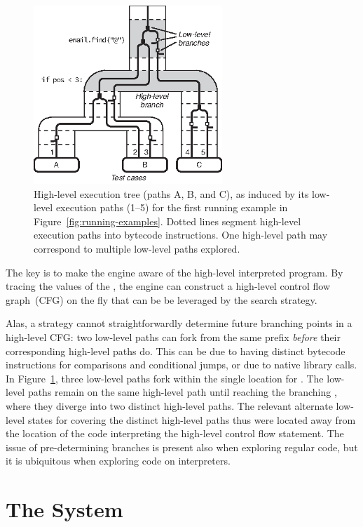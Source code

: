 \begin{figure}
  \centering
  \includegraphics[width=2.8in]{chef/figures/hl-symbex}
  \caption{High-level execution tree (paths A, B, and C), as induced by its low-level execution paths (1--5) for the first running example in Figure~\ref{fig:running-examples}.  Dotted lines segment high-level execution paths into bytecode instructions.  One high-level path may correspond to multiple low-level paths explored.}
  \label{fig:hl-symbex}
\end{figure}

The key is to make the engine aware of the high-level interpreted program. By tracing the values of the \hlpc, the engine can construct a high-level control flow graph~(CFG) on the fly that can be be leveraged by the search strategy.

Alas, a strategy cannot straightforwardly determine future branching points in a high-level CFG: two low-level paths can fork from the same prefix \emph{before} their corresponding high-level paths do.  This can be due to having distinct bytecode instructions for comparisons and conditional jumps, or due to native library calls.  
%
In Figure~\ref{fig:hl-symbex}, three low-level paths fork within the single \hlpc location for . The low-level paths remain on the same high-level path until reaching the branching \hlpc, where they diverge into two distinct high-level paths. The relevant alternate low-level states for covering the distinct high-level paths thus were located away from the location of the code interpreting the high-level control flow statement.
%
The issue of pre-determining branches is present also when exploring regular code, but it is ubiquitous when exploring code on interpreters.

\section{The \chef System}

